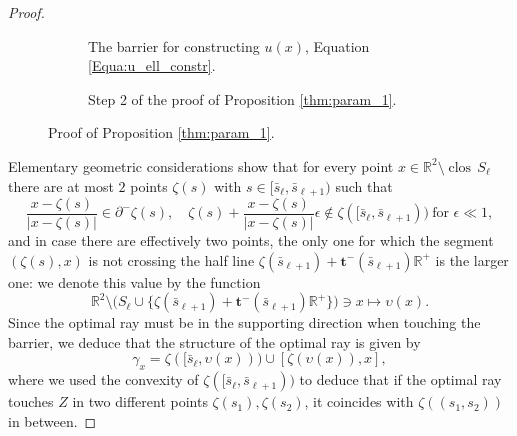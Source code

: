 \documentclass[reqno]{amsart}
\theoremstyle{definition} \newtheorem{definition}{Definition}[section]
\theoremstyle{definition} \newtheorem{remark}[definition]{Remark}
\theoremstyle{plain} \newtheorem{lemma}[definition]{Lemma}
\theoremstyle{plain} \newtheorem{proposition}[definition]{Proposition}
\theoremstyle{plain} \newtheorem{theorem}[definition]{Theorem}
\theoremstyle{plain} \newtheorem{corollary}[definition]{Corollary}
\theoremstyle{definition} \newtheorem{example}[definition]{Example}
\theoremstyle{plain} \newtheorem{claim}[clai]{Claim}
\theoremstyle{definition} \newtheorem{assumption}[definition]{Assumption}
\theoremstyle{definition} \newtheorem{observation}[definition]{Observation}
\DeclareMathOperator{\clos}{clos}
\newcommand{\R}{\mathbb{R}}
\newcommand{\1}{\mathbbm 1}
\numberwithin{equation}{section} %
\theoremstyle{plain} \newtheorem*{theorem*}{Theorem}
\theoremstyle{plain} \newtheorem{mthm}[maintheorem]{Main Theorem}
\theoremstyle{plain} \newtheorem*{mthm*}{Main Theorem}
\theoremstyle{plain} \newtheorem*{conjecture*}{Conjecture}
\theoremstyle{plain} \newtheorem{conjecture}[definition]{Conjecture}
\theoremstyle{plain} \newtheorem*{problem*}{Problem}
\begin{document}
\begin{proof}
\begin{figure}
\begin{subfigure}{.475\textwidth}
\resizebox{\textwidth}{!}{}
\caption{The barrier for constructing $u(x)$, Equation \ref{Equa:u_ell_constr}.}
\label{Fig:S_ell}
\end{subfigure} \hfill
\begin{subfigure}{.475\textwidth}
\resizebox{\textwidth}{!}{}
\caption{Step 2 of the proof of Proposition \ref{thm:param_1}.}
\label{Fig:S_ell_2}
\end{subfigure}
\caption{Proof of Proposition \ref{thm:param_1}.}
\label{Fig:S_ell_0}
\end{figure}

Elementary geometric considerations show that for every point $x \in \R^2 \setminus \clos\, S_\ell$ there are at most $2$ points $\zeta(s)$ with $s \in [\bar s_\ell,\bar s_{\ell+1})$ such that
\begin{equation*}
\frac{x - \zeta(s)}{|x - \zeta(s)|} \in \partial^- \zeta(s), \quad \zeta(s) + \frac{x - \zeta(s)}{|x - \zeta(s)|} \epsilon \notin \zeta([\bar s_\ell,\bar s_{\ell+1})) \ \text{for $\epsilon \ll 1$},
\end{equation*}
and in case there are effectively two points, the only one for which the segment $(\zeta(s),x)$ is not crossing the half line $\zeta(\bar s_{\ell+1}) + \mathbf t^-(\bar s_{\ell+1}) \R^+$ is the larger one: we denote this value by the function
$$
\R^2 \setminus \big( S_\ell \cup \big\{ \zeta(\bar s_{\ell+1}) + \mathbf t^-(\bar s_{\ell+1}) \R^+ \big\} \big) \ni x \mapsto \upsilon(x).
$$
Since the optimal ray must be in the supporting direction when touching the barrier, we deduce that the structure of the optimal ray is given by
\begin{equation}
\label{Equa:struct_optimal_ray_ell}
\gamma_x = \zeta([\bar s_\ell,\upsilon(x))) \cup [\zeta(\upsilon(x)),x],
\end{equation}
where we used the convexity of $\zeta([\bar s_\ell,\bar s_{\ell+1}))$ to deduce that if the optimal ray touches $Z$ in two different points $\zeta(s_1),\zeta(s_2)$, it coincides with $\zeta((s_1,s_2))$ in between.

\medskip


\end{proof}
\end{document}
